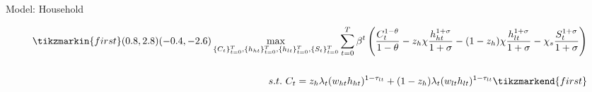 \documentclass[11pt,aspectratio=169]{beamer}
\begin{document}
\begin{frame}{Model: Household}

\vspace{2mm}
\begin{minipage}[t!]{1\textwidth}
	\begin{align*}
	\tikzmarkin{first}(0.8,2.8)(-0.4,-2.6)
 \max_{\{C_t\}_{t=0}^T, \{h_{ht}\}_{t=0}^T, \{h_{lt}\}_{t=0}^T, \{S_{t}\}_{t=0}^T} \sum_{t=0}^T \beta^t \left(\frac{C_t^{1-\theta}}{1-\theta}-z_h\chi\frac{h_{ht}^{1+\sigma}}{1+\sigma}-(1-z_h)\chi\frac{h_{lt}^{1+\sigma}}{1+\sigma}-\chi_s\frac{S_{t}^{1+\sigma}}{1+\sigma}\right) %
\\
\vspace{4mm}
\\
s.t.\ C_t=z_h \lambda_t (w_{ht}h_{ht})^{1-\tau_{lt}}+(1-z_h) \lambda_t (w_{lt}h_{lt})^{1-\tau_{lt}}%
	\tikzmarkend{first}
	\end{align*}
\end{minipage}

%


\end{frame}
\end{document}
